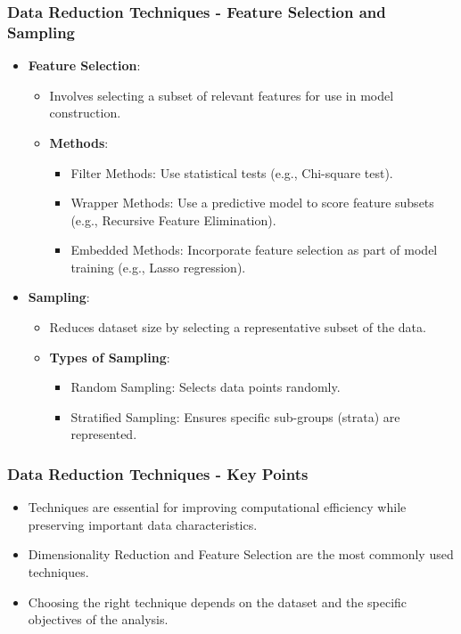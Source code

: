 \documentclass[aspectratio=169]{beamer}
\begin{document}
\begin{frame}[fragile]
    \frametitle{Data Reduction Techniques - Feature Selection and Sampling}
    \begin{itemize}
        \item \textbf{Feature Selection}:
            \begin{itemize}
                \item Involves selecting a subset of relevant features for use in model construction.
                \item \textbf{Methods}:
                \begin{itemize}
                    \item Filter Methods: Use statistical tests (e.g., Chi-square test).
                    \item Wrapper Methods: Use a predictive model to score feature subsets (e.g., Recursive Feature Elimination).
                    \item Embedded Methods: Incorporate feature selection as part of model training (e.g., Lasso regression).
                \end{itemize}
            \end{itemize}
        \item \textbf{Sampling}:
            \begin{itemize}
                \item Reduces dataset size by selecting a representative subset of the data.
                \item \textbf{Types of Sampling}:
                \begin{itemize}
                    \item Random Sampling: Selects data points randomly.
                    \item Stratified Sampling: Ensures specific sub-groups (strata) are represented.
                \end{itemize}
            \end{itemize}
    \end{itemize}
\end{frame}

\begin{frame}[fragile]
    \frametitle{Data Reduction Techniques - Key Points}
    \begin{itemize}
        \item Techniques are essential for improving computational efficiency while preserving important data characteristics.
        \item Dimensionality Reduction and Feature Selection are the most commonly used techniques.
        \item Choosing the right technique depends on the dataset and the specific objectives of the analysis.
    \end{itemize}
\end{frame}
\end{document}
